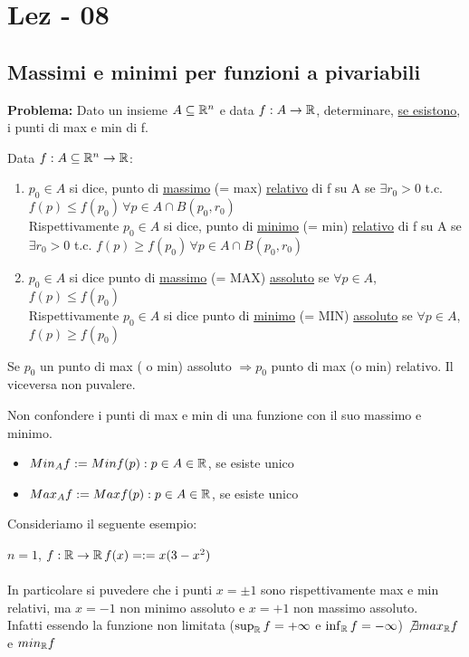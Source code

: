 \section{Lez - 08}
\subsection{Massimi e minimi per funzioni a pi\acu variabili}
\textbf{Problema:} Dato un insieme $A \subseteq \mathbb{R}^n$ e data $f:A\to\mathbb{R}$, determinare,
\underline{se esistono}, i punti di max e min di f.
\begin{definition}
  Data $f: A \subseteq \mathbb{R}^n \to \mathbb{R}$: 
  \begin{enumerate}
    \item $p_0 \in A$ si dice, punto di \underline{massimo} (= max) \underline{relativo} di f su A se 
          $\exists r_0 > 0$ t.c. $f(p) \leq f(p_0) \, \forall p \in A \cap B(p_0,r_0)$ \\
          Rispettivamente $p_0 \in A$ si dice, punto di \underline{minimo} (= min) \underline{relativo} di f su A se 
          $\exists r_0 > 0$ t.c. $f(p) \geq f(p_0) \, \forall p \in A \cap B(p_0,r_0)$
    \item $p_0 \in A$ si dice punto di \underline{massimo} (= MAX) \underline{assoluto} se 
          $\forall p \in A$, $f(p) \leq f(p_0)$ \\
          Rispettivamente $p_0 \in A$ si dice punto di \underline{minimo} (= MIN) \underline{assoluto} se 
          $\forall p \in A$, $f(p) \geq f(p_0)$ 
  \end{enumerate}
\end{definition}
\begin{osservazione}
  Se $p_0$ \ace un punto di max ( o min) assoluto $\Rightarrow p_0$ \ace punto di max (o min) relativo. Il 
  viceversa non pu\aco valere.
\end{osservazione}
\begin{NB}
  Non confondere i punti di max e min di una funzione con il suo massimo e minimo.
  \begin{itemize}
    \item $Min_{A} f := Min{f(p) : p \in A} \in \mathbb{R}$, se esiste \ace unico
    \item $Max_{A} f := Max{f(p) : p \in A} \in \mathbb{R}$, se esiste \ace unico
  \end{itemize}
\end{NB}
Consideriamo il seguente esempio:
\begin{example}
  $n=1$, $f : \mathbb{R} \to \mathbb{R} \, f(x) =:= x(3-x^2)$ \\\\
  In particolare si pu\aco vedere che i punti $x = \pm 1$ sono rispettivamente max e min relativi, ma $x=-1$ non \ace 
  minimo assoluto e $x=+1$ non \ace massimo assoluto. \\
  Infatti essendo la funzione non limitata ($\sup_{\mathbb{R}} f = +\infty$ e $\inf_{\mathbb{R}} f = -\infty$) $\not \exists max_{\mathbb{R}} f$ e $min_{\mathbb{R}} f$ 
\end{example}
